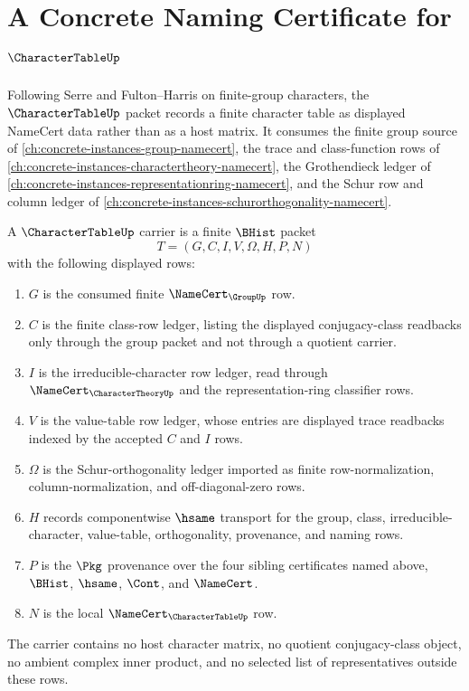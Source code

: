 \chapter{A Concrete Naming Certificate for $\CharacterTableUp$}
\label{ch:concrete-instances-character-table-namecert}

Following Serre and Fulton--Harris on finite-group characters, the $\CharacterTableUp$ packet records a finite character table as displayed NameCert data rather than as a host matrix. It consumes the finite group source of \autoref{ch:concrete-instances-group-namecert}, the trace and class-function rows of \autoref{ch:concrete-instances-charactertheory-namecert}, the Grothendieck ledger of \autoref{ch:concrete-instances-representationring-namecert}, and the Schur row and column ledger of \autoref{ch:concrete-instances-schurorthogonality-namecert}.

\begin{definition}
\label{def:character-table-carrier-sketch}
A $\CharacterTableUp$ carrier is a finite $\BHist$ packet
$$
T=(G,C,I,V,\Omega,H,P,N)
$$
with the following displayed rows:
\begin{enumerate}
\item $G$ is the consumed finite $\NameCert_{\GroupUp}$ row.
\item $C$ is the finite class-row ledger, listing the displayed conjugacy-class readbacks only through the group packet and not through a quotient carrier.
\item $I$ is the irreducible-character row ledger, read through $\NameCert_{\CharacterTheoryUp}$ and the representation-ring classifier rows.
\item $V$ is the value-table row ledger, whose entries are displayed trace readbacks indexed by the accepted $C$ and $I$ rows.
\item $\Omega$ is the Schur-orthogonality ledger imported as finite row-normalization, column-normalization, and off-diagonal-zero rows.
\item $H$ records componentwise $\hsame$ transport for the group, class, irreducible-character, value-table, orthogonality, provenance, and naming rows.
\item $P$ is the $\Pkg$ provenance over the four sibling certificates named above, $\BHist$, $\hsame$, $\Cont$, and $\NameCert$.
\item $N$ is the local $\NameCert_{\CharacterTableUp}$ row.
\end{enumerate}
The carrier contains no host character matrix, no quotient conjugacy-class object, no ambient complex inner product, and no selected list of representatives outside these rows.
\end{definition}

